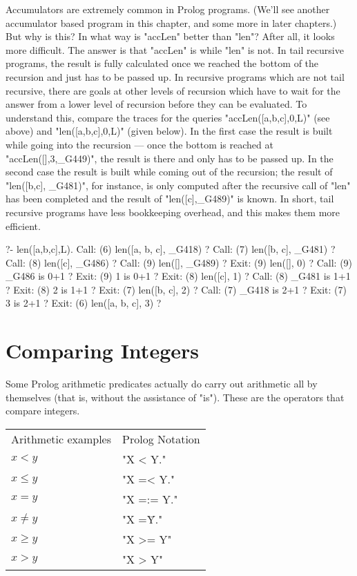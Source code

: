 Accumulators are extremely common in Prolog programs.  (We'll see
another accumulator based program in this chapter, and some more in
later chapters.) But why is this? In what way is "accLen" better than
"len"? After all, it looks more difficult. The answer is that "accLen"
is  while "len" is not. In tail recursive
programs, the result is fully calculated once we reached the bottom of
the recursion and just has to be passed up. In recursive programs
which are not tail recursive, there are goals at other levels of
recursion which have to wait for the answer from a lower level of
recursion before they can be evaluated. To understand this, compare
the traces for the queries "accLen([a,b,c],0,L)" (see above) and
"len([a,b,c],0,L)" (given below). In the first case the result is
built while going into the recursion --- once the bottom is reached at
"accLen([],3,\_G449)", the result is there and only has to be passed
up. In the second case the result is built while coming out of the
recursion; the result of "len([b,c], \_G481)", for instance, is only
computed after the recursive call of "len" has been completed and the
result of "len([c],\_G489)" is known. In short, tail recursive programs
have less bookkeeping overhead, and this makes them more efficient.

\begin{LPNcodedisplay}
?- len([a,b,c],L).
   Call: (6) len([a, b, c], _G418) ?
   Call: (7) len([b, c], _G481) ?
   Call: (8) len([c], _G486) ?
   Call: (9) len([], _G489) ?
   Exit: (9) len([], 0) ?
   Call: (9) _G486 is 0+1 ?
   Exit: (9) 1 is 0+1 ?
   Exit: (8) len([c], 1) ?
   Call: (8) _G481 is 1+1 ?
   Exit: (8) 2 is 1+1 ?
   Exit: (7) len([b, c], 2) ?
   Call: (7) _G418 is 2+1 ?
   Exit: (7) 3 is 2+1 ?
   Exit: (6) len([a, b, c], 3) ?
\end{LPNcodedisplay}


\section{Comparing Integers}\label{SEC.L5.COMPARING-INTEGERS}



Some Prolog arithmetic predicates actually do carry out arithmetic
all by themselves (that is, without the assistance of "is").
These are the operators that compare integers.

\begin{center}\begin{tabular}{ll}
Arithmetic examples & Prolog Notation\\
$x<y$&"X < Y."\\ \index{PROLOG </2@\texttt{</2}}
$x\le y$&"X =< Y."\\ \index{PROLOG =</2@\texttt{=</2}}
$x=y$&"X =:= Y."\\ \index{PROLOG =:=/2@\texttt{=:=/2}}
$x\not=y$&"X =\= Y."\\ \index{PROLOG =\=/2@\verb-=\=/2-}
$x\ge y$&"X >= Y"\\ \index{PROLOG >=/2@\texttt{>=/2}}
$x>y$&"X > Y" \index{PROLOG >/2@\texttt{>/2}}
\end{tabular}\end{center}

